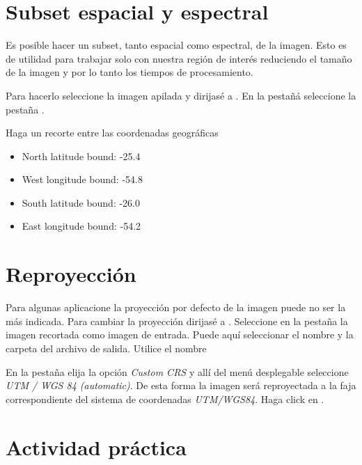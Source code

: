 \section{Subset espacial y espectral}
Es posible hacer un subset, tanto espacial como espectral, de la imagen. Esto es de utilidad para trabajar solo con nuestra región de interés reduciendo el tamaño de la imagen y por lo tanto los tiempos de procesamiento.

Para hacerlo seleccione la imagen apilada y dirijasé a . En la pestañá  seleccione la pestaña .

Haga un recorte entre las coordenadas geográficas
\begin{itemize}
    \item North latitude bound: -25.4
    \item West longitude bound: -54.8
    \item South latitude bound: -26.0
    \item East longitude bound: -54.2
\end{itemize}

\section{Reproyección}
Para algunas aplicacione la proyección por defecto de la imagen puede no ser la más indicada. Para cambiar la proyección dirijasé a . Seleccione en la pestaña  la imagen recortada como imagen de entrada. Puede aquí seleccionar el nombre y la carpeta del archivo de salida. Utilice el nombre

\begin{center}
\end{center}

En la pestaña  elija la opción \emph{Custom CRS} y allí del menú desplegable seleccione \emph{UTM / WGS 84 (automatic)}. De esta forma la imagen será reproyectada a la faja correspondiente del sistema de coordenadas \emph{UTM/WGS84}. Haga click en .

\section{Actividad práctica}

